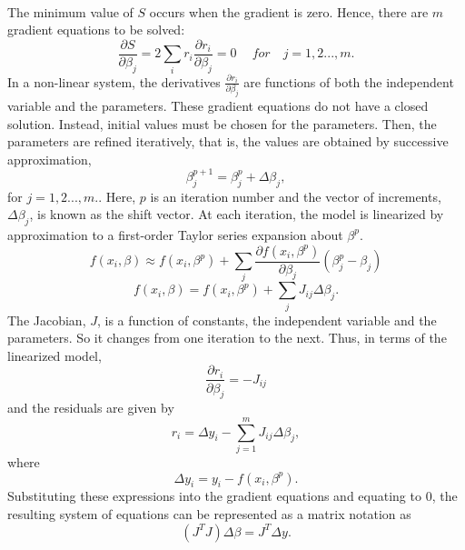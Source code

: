 \documentclass[a4paper,10pt]{report}
\begin{document}
\paragraph*{}
The minimum value of $S$ occurs when the gradient is zero. Hence, there are $m$ gradient equations to be solved:
\begin{equation}
    \frac{\partial S}{\partial \beta_j}=2\sum_i r_i\frac{\partial r_i}{\partial \beta_j}=0 \ \quad for \quad j=1,2...,m.
\end{equation}
In a non-linear system, the derivatives $\frac{\partial r_i}{\partial \beta_j}$ are functions of both the independent
variable and the parameters. These gradient equations do not have a
closed solution. Instead, initial values must be chosen for the
parameters. Then, the parameters are refined iteratively, that is,
the values are obtained by successive approximation,
\begin{equation}
    \beta_j^{p+1}=\beta^p_j+\Delta \beta_j,
\end{equation}
for $j=1,2...,m.$. Here, $p$ is an iteration number and the vector of increments, $\Delta \beta_j$, is known as the shift vector. At each iteration, the model is linearized by approximation to a first-order Taylor series expansion about $\beta^p$.
\begin{equation}
    f(x_i,\beta)\approx f(x_i,\beta^p) +\sum_j \frac{\partial f(x_i, \beta^p)}{\partial \beta_j} \left(\beta^p_j -\beta_j \right)
\end{equation}
\begin{equation}
 f(x_i,\beta) =f(x_i, \beta^p)+\sum_j J_{ij} \Delta\beta_j.
\end{equation}
The Jacobian, $J$, is a function of constants, the independent variable and the parameters. So it changes from one iteration to the
next. Thus, in terms of the linearized model,
\begin{equation}
\frac{\partial r_i}{\partial \beta_j}=-J_{ij}
\end{equation}
and the residuals are given by
\begin{equation}
    r_i=\Delta y_i- \sum_{j=1}^{m} J_{ij}\Delta\beta_j,
\end{equation}
where
\begin{equation}
 \Delta y_i=y_i- f(x_i, \beta^p).
\end{equation}
Substituting these expressions into the gradient equations and
equating to $0$, the resulting system of equations can be represented as a matrix notation as 
\begin{equation}
    \left(J^TJ\right)\Delta  \beta=J^T\Delta y.
\end{equation}
\end{document}
